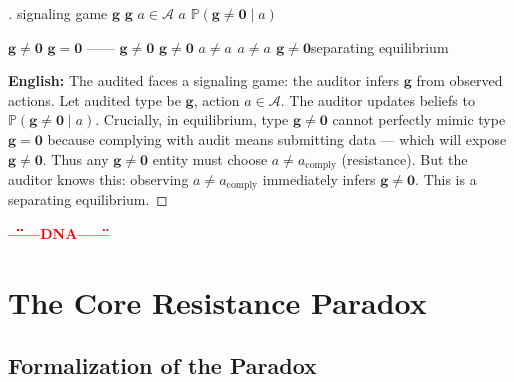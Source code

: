 \documentclass[12pt,a4paper]{article}
\theoremstyle{remark}
\newcommand{\Pbb}{\mathbb{P}}
\newcommand{\g}{\mathbf{g}}
\newcommand{\honestcrit}[1]{%
    \textcolor{red}{\textbf{#1}}%
}
\begin{document}
\begin{proof}[]
signaling game $ \g $ $ \g $ $ a \in \mathcal{A} $ $ a $  $ \Pbb(\g \neq \mathbf{0} \mid a) $

 $ \g \neq \mathbf{0} $  $ \g = \mathbf{0} $ —— $ \g \neq \mathbf{0} $ $ \g \neq \mathbf{0} $  $ a \neq a_{\text{}} $ $ a \neq a_{\text{}} $  $ \g \neq \mathbf{0} $separating equilibrium

\textbf{English:} The audited faces a signaling game: the auditor infers $ \g $ from observed actions. Let audited type be $ \g $, action $ a \in \mathcal{A} $. The auditor updates beliefs to $ \Pbb(\g \neq \mathbf{0} \mid a) $. Crucially, in equilibrium, type $ \g \neq \mathbf{0} $ cannot perfectly mimic type $ \g = \mathbf{0} $ because complying with audit means submitting data — which will expose $ \g \neq \mathbf{0} $. Thus any $ \g \neq \mathbf{0} $ entity must choose $ a \neq a_{\text{comply}} $ (resistance). But the auditor knows this: observing $ a \neq a_{\text{comply}} $ immediately infers $ \g \neq \mathbf{0} $. This is a separating equilibrium.
\end{proof}

\honestcrit{\"\"\"\"——DNA——\"\"}

\section{}
\section{The Core Resistance Paradox}

\subsection{}
\subsection{Formalization of the Paradox}
\end{document}
